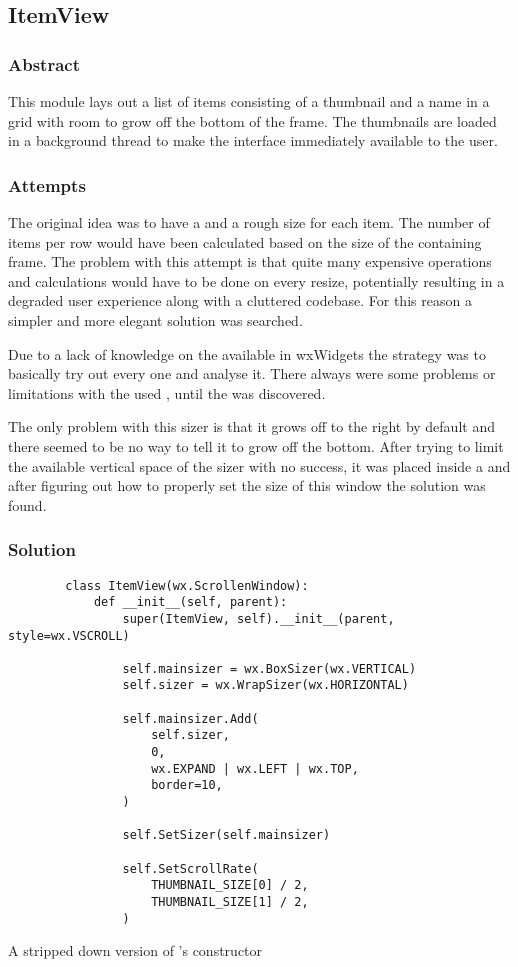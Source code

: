 \subsection{ItemView}
\def \kapitelautor {Clemens Stadlbauer}

\subsubsection{Abstract}
This module lays out a list of items consisting of a thumbnail and a name in a
grid with room to grow off the bottom of the frame. The thumbnails are loaded
in a background thread to make the interface immediately available to the user.

\subsubsection{Attempts}
The original idea was to have a  and a rough size for each
item. The number of items per row would have been calculated based on the size
of the containing frame. The problem with this attempt is that quite many
expensive operations and calculations would have to be done on every resize,
potentially resulting in a degraded user experience along with a cluttered
codebase. For this reason a simpler and more elegant solution was searched.

Due to a lack of knowledge on the available  in wxWidgets the
strategy was to basically try out every one and analyse it. There always were
some problems or limitations with the used , until the
 was discovered.

The only problem with this sizer is that it grows off to the right by default
and there seemed to be no way to tell it to grow off the bottom. After trying
to limit the available vertical space of the sizer with no success, it was
placed inside a  and after figuring out how to properly
set the size of this window the solution was found.

\subsubsection{Solution} %

\begin{listing}[p]
	\begin{verbatim}
		class ItemView(wx.ScrollenWindow):
			def __init__(self, parent):
				super(ItemView, self).__init__(parent, style=wx.VSCROLL)

				self.mainsizer = wx.BoxSizer(wx.VERTICAL)
				self.sizer = wx.WrapSizer(wx.HORIZONTAL)

				self.mainsizer.Add(
					self.sizer,
					0,
					wx.EXPAND | wx.LEFT | wx.TOP,
					border=10,
				)

				self.SetSizer(self.mainsizer)

				self.SetScrollRate(
					THUMBNAIL_SIZE[0] / 2,
					THUMBNAIL_SIZE[1] / 2,
				)
	\end{verbatim}
	\caption{A stripped down version of 's constructor}
	\label{lst:mod:itemview}
\end{listing}

